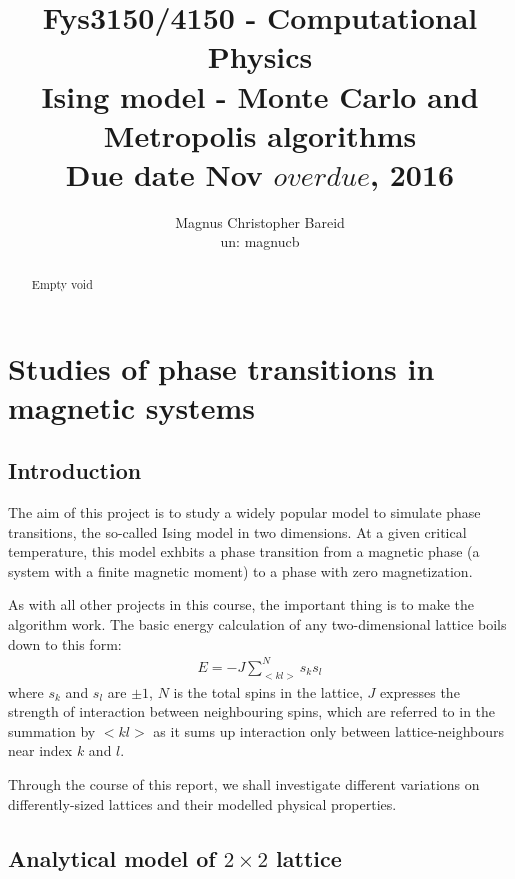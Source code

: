 \documentclass[11pt,a4paper,notitlepage,twocolumn]{article}
\title{\normalsize Fys3150/4150 - Computational Physics\\
\vspace{10mm}
\huge Ising model - Monte Carlo and Metropolis algorithms\\
\vspace{10mm}
\normalsize Due date {\bf Nov $overdue$, 2016}}
\author{Magnus Christopher Bareid \\ un: magnucb }
\begin{document}
\noindent
\maketitle
\vspace{5mm}




\begin{abstract}
Empty void %
\end{abstract}




\newpage
\tableofcontents

\newpage

\section{Studies of phase transitions in magnetic systems}
\subsection{Introduction}
The aim of this project is to study a widely popular model to simulate phase transitions, the so-called Ising model in two dimensions. At a given critical temperature, this model exhbits a phase transition from a magnetic phase (a system with a finite magnetic moment) to a phase with zero magnetization.

As with all other projects in this course, the important thing is to make the algorithm work. The basic energy calculation of any two-dimensional lattice boils down to this form:
\begin{align}
E = -J \sum^N_{<kl>} s_ks_l
\end{align}
where $s_k$ and $s_l$ are $\pm 1$, $N$ is the total spins in the lattice, $J$ expresses the strength of interaction between neighbouring spins, which are referred to in the summation by $<kl>$ as it sums up interaction only between lattice-neighbours near index $k$ and $l$.

Through the course of this report, we shall investigate different variations on differently-sized lattices and their modelled physical properties.

\subsection{Analytical model of $2\times2$ lattice}
\end{document}
